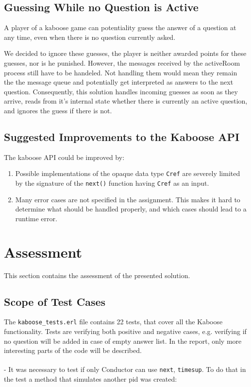 \documentclass[11pt, a4paper]{article}
\begin{document}
\subsection{Guessing While no Question is Active}
A player of a kaboose game can potentiality guess the answer of a question at any time, even when there is no question currently asked.

We decided to ignore these guesses, the player is neither awarded points for these guesses, nor is he punished.
However, the messages received by the activeRoom process still have to be handeled. Not handling them would mean they remain the the message queue and potentially get interpreted as answers to the next question. Consequently, this solution handles incoming guesses as soon as they arrive, reads from it's internal state whether there is currently an active question, and ignores the guess if there is not.

\subsection{Suggested Improvements to the Kaboose API}
The kaboose API could be improved by:
\begin{enumerate}
	\item Possible implementations of the opaque data type \texttt{Cref} are severely limited by the signature of the \texttt{next()} function having \texttt{Cref} as an input.
	\item Many error cases are not specified in the assignment. This makes it hard to determine what should be handled properly, and which cases should lead to a runtime error.
\end{enumerate}


\pagebreak
\section{Assessment}
This section contains the assessment of the presented solution.


\subsection{Scope of Test Cases}
The \texttt{kaboose\_tests.erl} file contains 22 tests, that cover all the Kaboose functionality. Tests are verifying both positive and negative cases, e.g. verifying if no question will be added in case of empty answer list. In the report, only more interesting parts of the code will be described. 
\\
\\
\noindent - It was necessary to test if only Conductor can use  \texttt{next}, \texttt{timesup}. To do that in the test a method that simulates another pid was created:
\end{document}
